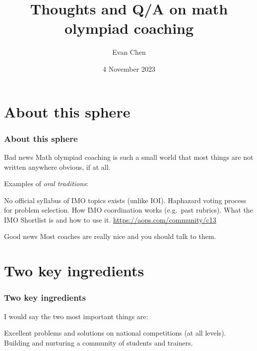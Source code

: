 \documentclass[10pt]{beamer}
\begin{document}
\title{Thoughts and Q/A on math olympiad coaching}
\subtitle{}
\author{Evan Chen}
\date{4 November 2023}

\maketitle

\section{About this sphere}
\begin{frame}
  \frametitle{About this sphere}
  \begin{alertblock}{Bad news}
    Math olympiad coaching is such a small world that
    most things are not written anywhere obvious, if at all.
  \end{alertblock}
  \pause
  Examples of \emph{oral traditions}:
  \begin{itemize}
    \ii No official syllabus of IMO topics exists (unlike IOI).
    \ii Haphazard voting process for problem selection.
    \ii How IMO coordination works (e.g.\ past rubrics).
    \ii What the IMO Shortlist is and how to use it.
    \ii \url{https://aops.com/community/c13}
  \end{itemize}
  \pause
  \begin{exampleblock}{Good news}
    Most coaches are really nice and you should talk to them.
  \end{exampleblock}
\end{frame}

\section{Two key ingredients}
\begin{frame}
  \frametitle{Two key ingredients}
  I would say the \alert{two most important things} are:
  \begin{itemize}
    \ii Excellent problems and solutions on national competitions (at all levels).
    \ii Building and nurturing a community of students and trainers.
  \end{itemize}
\end{frame}
\end{document}
